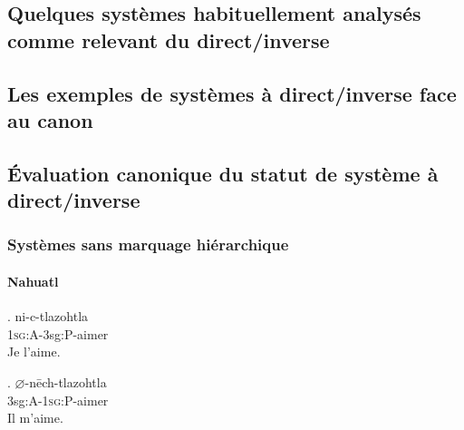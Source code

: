 \subsection[Exemples de direct/inverse]{Quelques systèmes habituellement analysés comme relevant du direct/inverse}


\subsection[Décalages par rapport au canon]{Les exemples de systèmes à direct/inverse face au canon}

\subsection[Évaluation du direct/inverse]{Évaluation canonique du statut de système à direct/inverse}
\begin{frame}
\frametitle{Systèmes sans marquage hiérarchique}
\framesubtitle{Nahuatl}

\ex. ni-c-tlazohtla \\
1\textsc{sg}:A-3sg:P-aimer \\
Je l'aime.


\ex. $\varnothing$-nēch-tlazohtla \\
3sg:A-1\textsc{sg}:P-aimer \\
Il m'aime.

\end{frame}



